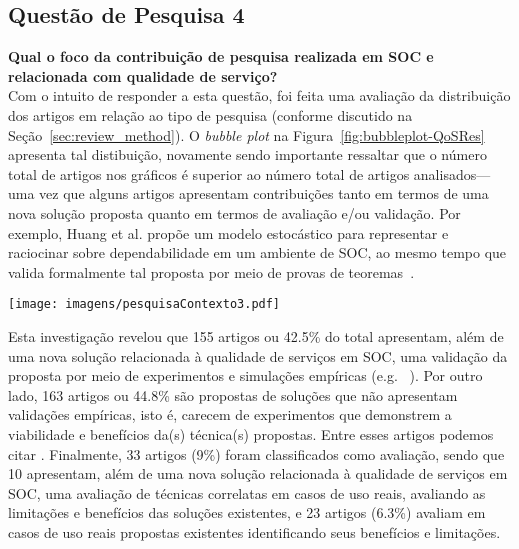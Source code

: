 \subsection{Questão de Pesquisa 4}\label{sub:QP4}

\textbf{Qual o foco da contribuição de pesquisa realizada em SOC e relacionada com qualidade de serviço? }
\\[0.01in]

Com o intuito de responder a esta questão, foi feita uma avalia\c c\~{a}o da distribui\c c\~{a}o dos 
artigos em rela\c c\~{a}o ao tipo de pesquisa (conforme discutido na Se\c c\~{a}o~\ref{sec:review_method}). 
O \emph{bubble plot} na Figura~\ref{fig:bubbleplot-QoSRes}  apresenta tal distibui\c c\~{a}o, novamente sendo importante ressaltar que o n\'{u}mero total de artigos nos gr\'{a}ficos \'{e} superior ao n\'{u}mero total de artigos analisados--- uma vez que alguns artigos apresentam contribui\c c\~{o}es tanto em termos de uma nova solu\c c\~{a}o proposta quanto em termos de avalia\c c\~{a}o e/ou valida\c c\~{a}o. Por exemplo, Huang et al. prop\~{o}e um modelo estoc\'{a}stico para representar e raciocinar sobre dependabilidade em um ambiente de SOC, ao mesmo tempo que valida formalmente tal proposta por meio de provas de teoremas~\cite{huang:scc2011}.

\begin{figure*}[htb]
\centering
\texttt{[image: imagens/pesquisaContexto3.pdf]}
\caption{\emph{Bubble plot} com a distribui\c{c}\~{a}o envolvendo tipos de pesquisa e contexto(QoS)}
\label{fig:bubbleplot-QoSRes}
\end{figure*}

Esta investiga\c c\~{a}o revelou que 155 artigos ou 42.5\% do total apresentam, al\'{e}m de uma nova solu\c c\~{a}o relacionada \`{a} qualidade de servi\c cos em SOC, uma validação da proposta por meio de experimentos e simulações empíricas (e.g.  ~\cite{jeong:fqs2009,ardagna:jss2010,huang:scc2011,binshtok:icsoc2009}). Por outro lado, 163 artigos ou 44.8\% s\~{a}o propostas de solu\c c\~{o}es que não apresentam validações empíricas, isto é, carecem de experimentos que demonstrem a viabilidade e benefícios da(s) técnica(s) propostas. Entre esses artigos podemos citar \cite{filieri:faa2012,nascimento:splc2011,balfagih:icime2011,Clark:2009}. Finalmente, 33 artigos (9\%) foram classificados como avaliação, sendo que 10 apresentam, al\'{e}m de uma nova solu\c c\~{a}o relacionada \`{a} qualidade de servi\c cos em SOC, uma avaliação de técnicas correlatas em casos de uso reais, avaliando as limitações e benefícios das soluções existentes, e 23 artigos (6.3\%) avaliam em casos de uso reais propostas existentes 
identificando seus benefícios e limitações.

